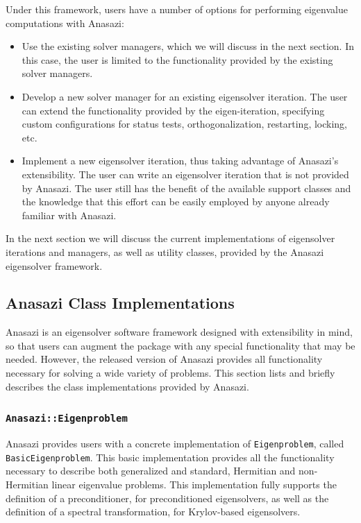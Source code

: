 \documentclass[acmtoms,acmnow]{acmtrans2m}
\newcommand{\aspace}[1]{\texttt{#1}}
\begin{document}
Under this framework, users have a number of options for performing eigenvalue
computations with Anasazi:
\begin{itemize}
\item
Use the existing solver managers, which we will discuss in the next section. 
In this case, the user is limited to the functionality provided by the existing 
solver managers.
\item
Develop a new solver manager for an existing eigensolver iteration.
The user can extend the functionality provided by the eigen-iteration,
specifying custom configurations for status tests, orthogonalization, restarting, 
locking, etc.
\item
Implement a new eigensolver iteration, thus taking advantage of Anasazi's extensibility. 
The user can write an eigensolver iteration that is not provided by Anasazi. 
The user still has the benefit of the available support classes 
and the knowledge that this effort can be easily employed by anyone already 
familiar with Anasazi.
\end{itemize}
In the next section we will discuss the current implementations of
eigensolver iterations and managers, as well as utility classes, provided
by the Anasazi eigensolver framework.

\subsection{Anasazi Class Implementations}
\label{subsec:anasazi:classes}

Anasazi is an eigensolver software framework designed with extensibility in mind, 
so that users can augment the package with any special functionality that may be
needed. However, the released version of Anasazi provides all
functionality necessary for solving a wide variety of problems. This
section lists and briefly describes the class implementations provided
by Anasazi.


\subsubsection{\aspace{Anasazi::Eigenproblem}}

Anasazi provides users with a concrete implementation of \aspace{Eigenproblem}, called
\aspace{BasicEigenproblem}. This basic implementation provides all the functionality
necessary to describe both generalized and standard, Hermitian and non-Hermitian linear
eigenvalue problems. This implementation fully supports the definition of a
preconditioner, for preconditioned eigensolvers, as well as the definition of a spectral
transformation, for Krylov-based eigensolvers. 
\end{document}
